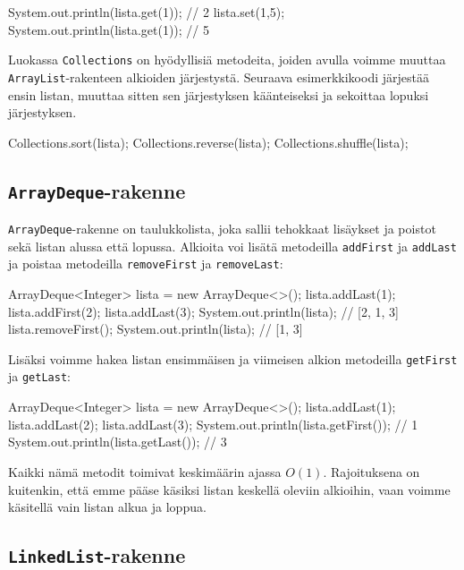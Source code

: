 \begin{code}
System.out.println(lista.get(1)); // 2
lista.set(1,5);
System.out.println(lista.get(1)); // 5
\end{code}

Luokassa \texttt{Collections} on hyödyllisiä metodeita,
joiden avulla voimme muuttaa \texttt{ArrayList}-rakenteen
alkioiden järjestystä.
Seuraava esimerkkikoodi järjestää ensin listan,
muuttaa sitten sen järjestyksen käänteiseksi
ja sekoittaa lopuksi järjestyksen.

\begin{code}
Collections.sort(lista);
Collections.reverse(lista);
Collections.shuffle(lista);
\end{code}

\subsection{\texttt{ArrayDeque}-rakenne}

\texttt{ArrayDeque}-rakenne on taulukkolista,
joka sallii tehokkaat lisäykset ja poistot
sekä listan alussa että lopussa.
Alkioita voi lisätä
metodeilla \texttt{addFirst} ja \texttt{addLast}
ja poistaa
metodeilla \texttt{removeFirst} ja \texttt{removeLast}:

\begin{code}
ArrayDeque<Integer> lista = new ArrayDeque<>();
lista.addLast(1);
lista.addFirst(2);
lista.addLast(3);
System.out.println(lista); // [2, 1, 3]
lista.removeFirst();
System.out.println(lista); // [1, 3]
\end{code}

Lisäksi voimme hakea listan ensimmäisen ja viimeisen
alkion metodeilla \texttt{getFirst} ja \texttt{getLast}:

\begin{code}
ArrayDeque<Integer> lista = new ArrayDeque<>();
lista.addLast(1);
lista.addLast(2);
lista.addLast(3);
System.out.println(lista.getFirst()); // 1
System.out.println(lista.getLast()); // 3
\end{code}

Kaikki nämä metodit toimivat keskimäärin ajassa $O(1)$.
Rajoituksena on kuitenkin, että emme pääse käsiksi
listan keskellä oleviin alkioihin, vaan voimme käsitellä
vain listan alkua ja loppua.

\subsection{\texttt{LinkedList}-rakenne}


